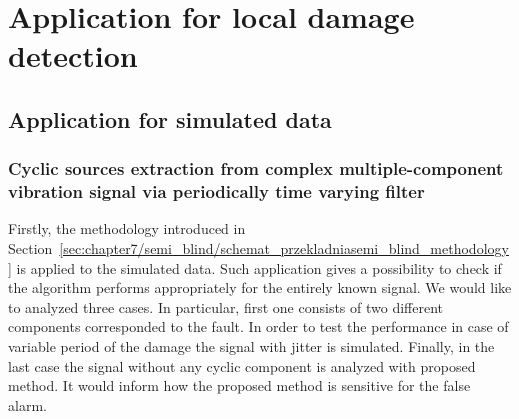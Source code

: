 \chapter{Application for local damage detection}\label{chap:application}
\section{Application for simulated data}
\subsection{Cyclic sources extraction from complex multiple-component vibration signal via periodically time varying filter}
Firstly, the methodology introduced in Section~\ref{sec:chapter7/semi_blind/schemat_przekladniasemi_blind_methodology} is applied to the simulated data. Such application gives a possibility to check if the algorithm performs appropriately for the entirely known signal. We would like to analyzed three cases. In particular, first one consists of two different components corresponded to the fault. In order to test the performance in case of variable period of the damage the signal with jitter is simulated. Finally, in the last case the signal without any cyclic component is analyzed with proposed method. It would inform how the proposed method is sensitive for the false alarm.

